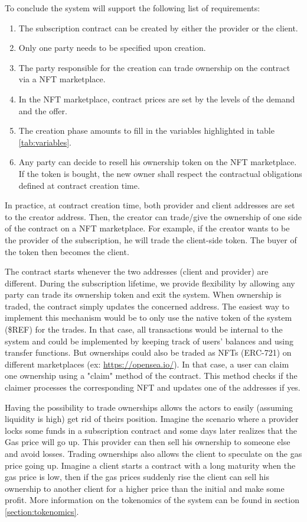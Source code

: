 To conclude the system will support the following list of requirements: 
\begin{enumerate}
    \item The subscription contract can be created by either the provider or the client. 
    \item Only one party needs to be specified upon creation. 
    \item The party responsible for the creation can trade ownership on the contract via a NFT marketplace.
    \item In the NFT marketplace, contract prices are set by the levels of the demand and the offer.  
    \item The creation phase amounts to fill in the variables highlighted in table \ref{tab:variables}. 
    \item Any party can decide to resell his ownership token on the NFT marketplace. If the token is bought, the new owner shall respect the contractual obligations defined at contract creation time.
\end{enumerate}

In practice, at contract creation time, both provider and client addresses are set to the creator address. Then, the creator can trade/give the ownership of one side of the contract on a NFT marketplace. For example, if the creator wants to be the provider of the subscription, he will trade the client-side token. The buyer of the token then becomes the client. 

The contract starts whenever the two addresses (client and provider) are different. During the subscription lifetime, we provide flexibility by allowing any party can trade its ownership token and exit the system. When ownership is traded, the contract simply updates the concerned address. The easiest way to implement this mechanism would be to only use the native token of the system (\$REF) for the trades. In that case, all transactions would be internal to the {\projectName} system and could be implemented by keeping track of users' balances and using transfer functions. But ownerships could also be traded as NFTs (ERC-721) on different marketplaces (ex: \href{opensea}{https://opensea.io/}). In that case, a user can claim one ownership using a "claim" method of the contract. This method checks if the claimer processes the corresponding NFT and updates one of the addresses if yes.

Having the possibility to trade ownerships allows the actors to easily (assuming liquidity is high) get rid of theirs position. Imagine the scenario where a provider locks some funds in a subscription contract and some days later realizes that the Gas price will go up. This provider can then sell his ownership to someone else and avoid losses. Trading ownerships also allows the client to speculate on the gas price going up. Imagine a client starts a contract with a long maturity when the gas price is low, then if the gas prices suddenly rise the client can sell his ownership to another client for a higher price than the initial and make some profit.
More information on the tokenomics of the system can be found in section \ref{section:tokenomics}.


